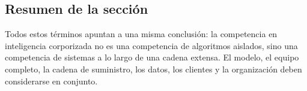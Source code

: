 \subsection{Resumen de la sección}

Todos estos términos apuntan a una misma conclusión: la competencia en inteligencia corporizada no es una competencia de algoritmos aislados, sino una competencia de sistemas a lo largo de una cadena extensa. El modelo, el equipo completo, la cadena de suministro, los datos, los clientes y la organización deben considerarse en conjunto.
